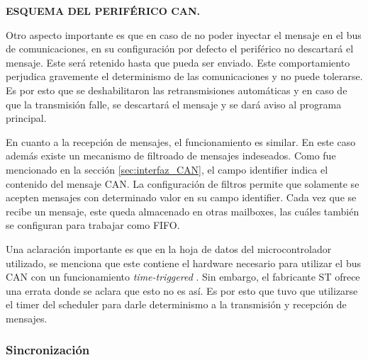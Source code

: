 {\Large \textbf{{\color{red} ESQUEMA DEL PERIFÉRICO CAN.}}}

Otro aspecto importante es que en caso de no poder inyectar el mensaje en el bus de comunicaciones, en su configuración por defecto el periférico no descartará el mensaje. Este será retenido hasta que pueda ser enviado. Este comportamiento perjudica gravemente el determinismo de las comunicaciones y no puede tolerarse. Es por esto que se deshabilitaron las retransmisiones automáticas y en caso de que la transmisión falle, se descartará el mensaje y se dará aviso al programa principal.

En cuanto a la recepción de mensajes, el funcionamiento es similar. En este caso además existe un mecanismo de filtroado de mensajes indeseados. Como fue mencionado en la sección \ref{sec:interfaz_CAN}, el campo identifier indica el contenido del mensaje CAN. La configuración de filtros permite que solamente se acepten mensajes con determinado valor en su campo identifier. Cada vez que se recibe un mensaje, este queda almacenado en otras mailboxes, las cuáles también se configuran para trabajar como FIFO.


Una aclaración importante es que en la hoja de datos del microcontrolador utilizado, se menciona que este contiene el hardware necesario para utilizar el bus CAN con un funcionamiento \textit{time-triggered} \cite[p.~1295]{RM0385}. Sin embargo, el fabricante ST ofrece una errata \cite{STM32F746_errata} donde se aclara que esto no es así. Es por esto que tuvo que utilizarse el timer del scheduler para darle determinismo a la transmisión y recepción de mensajes.

\subsubsection{Sincronización}


